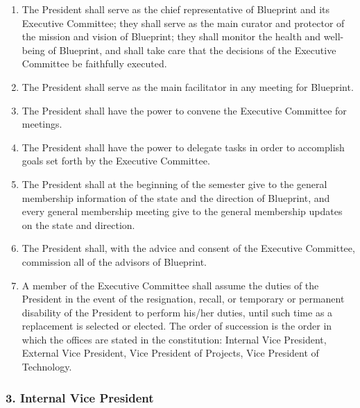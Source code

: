 \documentclass[
]{article}
\providecommand{\tightlist}{%
  \setlength{\itemsep}{0pt}\setlength{\parskip}{0pt}}
\begin{document}
\begin{enumerate}
\def\labelenumi{\arabic{enumi}.}
\tightlist
\item
  The President shall serve as the chief representative of Blueprint and
  its Executive Committee; they shall serve as the main curator and
  protector of the mission and vision of Blueprint; they shall monitor
  the health and well-being of Blueprint, and shall take care that the
  decisions of the Executive Committee be faithfully executed.
\item
  The President shall serve as the main facilitator in any meeting for
  Blueprint.
\item
  The President shall have the power to convene the Executive Committee
  for meetings.
\item
  The President shall have the power to delegate tasks in order to
  accomplish goals set forth by the Executive Committee.
\item
  The President shall at the beginning of the semester give to the
  general membership information of the state and the direction of
  Blueprint, and every general membership meeting give to the general
  membership updates on the state and direction.
\item
  The President shall, with the advice and consent of the Executive
  Committee, commission all of the advisors of Blueprint.
\item
  A member of the Executive Committee shall assume the duties of the
  President in the event of the resignation, recall, or temporary or
  permanent disability of the President to perform his/her duties, until
  such time as a replacement is selected or elected. The order of
  succession is the order in which the offices are stated in the
  constitution: Internal Vice President, External Vice President, Vice
  President of Projects, Vice President of Technology.
\end{enumerate}

\hypertarget{internal-vice-president}{%
\subsubsection{3. Internal Vice
President}\label{internal-vice-president}}
\end{document}
